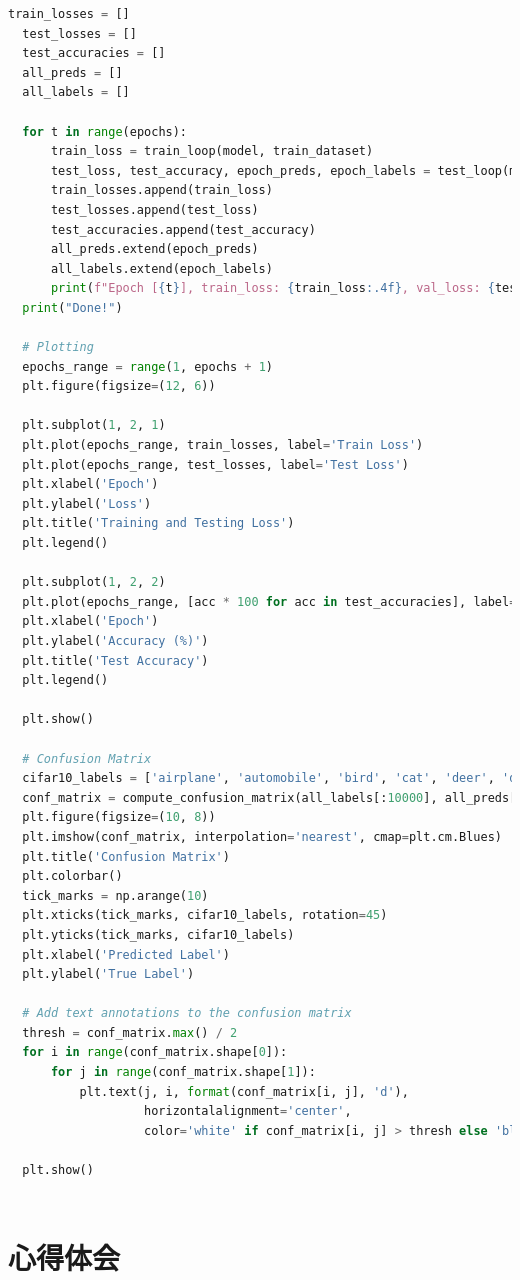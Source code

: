 \documentclass[12pt]{article}
\begin{document}
\begin{lstlisting}[language=Python]
  train_losses = []
  test_losses = []
  test_accuracies = []
  all_preds = []
  all_labels = []
  
  for t in range(epochs):
      train_loss = train_loop(model, train_dataset)
      test_loss, test_accuracy, epoch_preds, epoch_labels = test_loop(model, test_dataset, loss_fn)
      train_losses.append(train_loss)
      test_losses.append(test_loss)
      test_accuracies.append(test_accuracy)
      all_preds.extend(epoch_preds)
      all_labels.extend(epoch_labels)
      print(f"Epoch [{t}], train_loss: {train_loss:.4f}, val_loss: {test_loss:.4f}, val_acc: {test_accuracy:.4f}")
  print("Done!")
  
  # Plotting
  epochs_range = range(1, epochs + 1)
  plt.figure(figsize=(12, 6))
  
  plt.subplot(1, 2, 1)
  plt.plot(epochs_range, train_losses, label='Train Loss')
  plt.plot(epochs_range, test_losses, label='Test Loss')
  plt.xlabel('Epoch')
  plt.ylabel('Loss')
  plt.title('Training and Testing Loss')
  plt.legend()
  
  plt.subplot(1, 2, 2)
  plt.plot(epochs_range, [acc * 100 for acc in test_accuracies], label='Test Accuracy')
  plt.xlabel('Epoch')
  plt.ylabel('Accuracy (%)')
  plt.title('Test Accuracy')
  plt.legend()
  
  plt.show()
  
  # Confusion Matrix
  cifar10_labels = ['airplane', 'automobile', 'bird', 'cat', 'deer', 'dog', 'frog', 'horse', 'ship', 'truck']
  conf_matrix = compute_confusion_matrix(all_labels[:10000], all_preds[:10000], 10)
  plt.figure(figsize=(10, 8))
  plt.imshow(conf_matrix, interpolation='nearest', cmap=plt.cm.Blues)
  plt.title('Confusion Matrix')
  plt.colorbar()
  tick_marks = np.arange(10)
  plt.xticks(tick_marks, cifar10_labels, rotation=45)
  plt.yticks(tick_marks, cifar10_labels)
  plt.xlabel('Predicted Label')
  plt.ylabel('True Label')
  
  # Add text annotations to the confusion matrix
  thresh = conf_matrix.max() / 2
  for i in range(conf_matrix.shape[0]):
      for j in range(conf_matrix.shape[1]):
          plt.text(j, i, format(conf_matrix[i, j], 'd'),
                   horizontalalignment='center',
                   color='white' if conf_matrix[i, j] > thresh else 'black')
  
  plt.show()  
  
\end{lstlisting}

\newpage
\section{\centering 心得体会}
\end{document}
